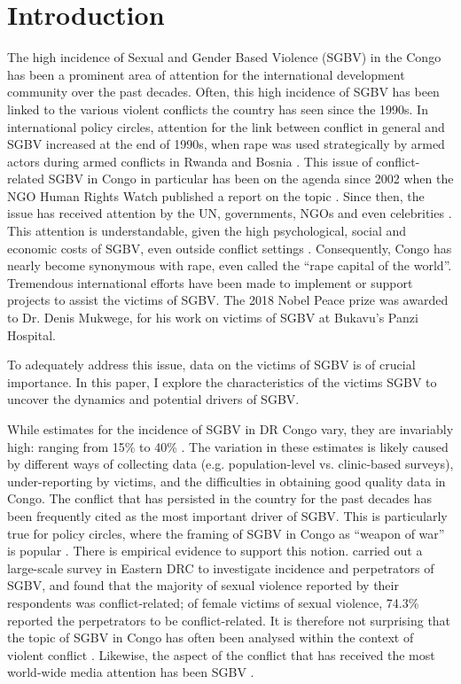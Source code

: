 \documentclass[10pt,a4paper]{scrartcl} %
\begin{document}


\section*{Introduction}
The high incidence of Sexual and Gender Based Violence (SGBV) in the Congo has been a prominent area of attention for the international development community over the past decades. Often, this high incidence of SGBV has been linked to the various violent conflicts the country has seen since the 1990s. In international policy circles, attention for the link between conflict in general and SGBV increased at the end of 1990s, when rape was used strategically by armed actors during armed conflicts in Rwanda and Bosnia  \citep{Kirby2015}. This issue of conflict-related SGBV in Congo in particular has been on the agenda since 2002 when the NGO Human Rights Watch published a report on the topic \citep{HRW2002}. Since then, the issue has received attention by the UN, governments, NGOs and even celebrities \citep{Baaz2013}. This attention is understandable, given the high psychological, social and economic costs of SGBV, even outside conflict settings \citep{Post2002,Peterson2018}. Consequently, Congo has nearly become synonymous with rape, even called the ``rape capital of the world''. Tremendous international efforts have been made to implement or support projects to assist the victims of SGBV. The 2018 Nobel Peace prize was awarded to Dr. Denis Mukwege, for his work on victims of SGBV at Bukavu's Panzi Hospital.
 
To adequately address this issue, data on the victims of SGBV is of crucial importance. In this paper, I explore the characteristics of the victims SGBV to uncover the dynamics and potential drivers of SGBV.

While estimates for the incidence of SGBV in DR Congo vary, they are invariably high: ranging from 15\% to 40\% \citep{Johnson2010,Peterman2011}. The variation in these estimates is likely caused by different ways of collecting data (e.g. population-level vs. clinic-based surveys), under-reporting by victims, and the difficulties in obtaining good quality data in Congo. The conflict that has persisted in the country for the past decades has been frequently cited as the most important driver of SGBV. This is particularly true for policy circles, where the framing of SGBV in Congo as ``weapon of war'' is popular \citep{Baaz2013,Kirby2015}. There is empirical evidence to support this notion. \cite{Johnson2010} carried out a large-scale survey in Eastern DRC to investigate incidence and perpetrators of SGBV, and found that the majority of sexual violence reported by their respondents was conflict-related; of female victims of sexual violence, 74.3\% reported the perpetrators to be conflict-related. It is therefore not surprising that the topic of SGBV in Congo has often been analysed within the context of violent conflict \citep{Baaz2013}. Likewise, the aspect of the conflict that has received the most world-wide media attention has been SGBV \citep{Autesserre2012a}.  
\end{document}
